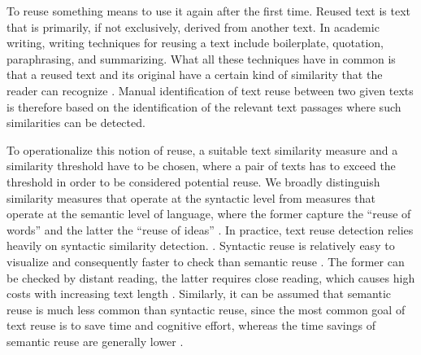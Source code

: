 To reuse something means to use it again after the first time. Reused text is text that is primarily, if not exclusively, derived from another text. In academic writing, writing techniques for reusing a text include boilerplate, quotation, paraphrasing,
%
and summarizing. What all these techniques have in common is that a reused text and its original have a certain kind of similarity that the reader can recognize \cite{weber-wulff:2002}. Manual identification of text reuse between two given texts is therefore based on the identification of the relevant text passages where such similarities can be detected.


To operationalize this notion of reuse, a suitable text similarity measure and a similarity threshold have to be chosen, where a pair of texts has to exceed the threshold in order to be considered potential reuse. We broadly distinguish similarity measures that operate at the syntactic level from measures that operate at the semantic level of language, where the former capture the ``reuse of words'' and the latter the ``reuse of ideas'' \cite{sadeghi:2019}.
In practice, text reuse detection relies heavily on syntactic similarity detection. \cite{moskovitz:2021,vroniplag:2021}. Syntactic reuse is relatively easy to visualize and consequently faster to check than semantic reuse \cite{riehmann:2015}. The former can be checked by distant reading, the latter requires close reading, which causes high costs with increasing text length \cite{moretti:2013}. Similarly, it can be assumed that semantic reuse is much less common than syntactic reuse, since the most common goal of text reuse is to save time and cognitive effort, whereas the time savings of semantic reuse are generally lower \cite{potthast:2013c}.

